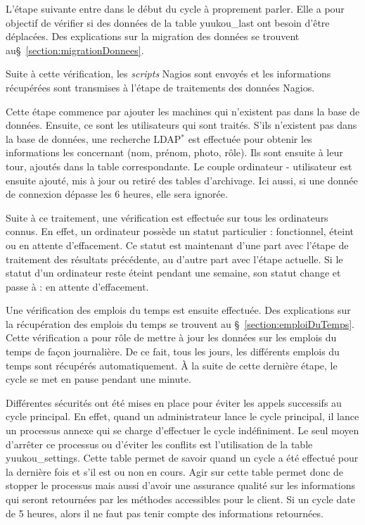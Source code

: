 L'\'etape suivante entre dans le d\'ebut du cycle \`a proprement parler.
Elle a pour objectif de v\'erifier si des donn\'ees de la table \textsf{yuukou\_last} ont besoin d'\^etre d\'eplac\'ees.
Des explications sur la migration des donn\'ees se trouvent au\S~\ref{section:migrationDonnees}.

Suite \`a cette v\'erification, les \textit{scripts} Nagios sont envoy\'es et les informations r\'ecup\'er\'ees sont transmises \`a l'\'etape de traitements des donn\'ees Nagios.

Cette \'etape commence par ajouter les machines qui n'existent pas dans la base de donn\'ees.
Ensuite, ce sont les utilisateurs qui sont trait\'es.
S'ils n'existent pas dans la base de donn\'ees, une recherche LDAP$^*$ est effectu\'ee pour obtenir les informations les concernant (nom, pr\'enom, photo, r\^ole).
Ils sont ensuite \`a leur tour, ajout\'es dans la table correspondante.
Le couple ordinateur - utilisateur est ensuite ajout\'e, mis \`a jour ou retir\'e des tables d'archivage.
Ici aussi, si une donn\'ee de connexion d\'epasse les 6 heures, elle sera ignor\'ee.

Suite \`a ce traitement, une v\'erification est effectu\'ee sur tous les ordinateurs connus.
En effet, un ordinateur poss\`ede un statut particulier : fonctionnel, \'eteint ou en attente d'effacement.
Ce statut est maintenant d'une part avec l'\'etape de traitement des r\'esultats pr\'ec\'edente, au d'autre part avec l'\'etape actuelle.
Si le statut d'un ordinateur reste \'eteint pendant une semaine, son statut change et passe \`a : en attente d'effacement.

Une v\'erification des emplois du temps est ensuite effectu\'ee.
Des explications sur la r\'ecup\'eration des emplois du temps se trouvent au \S~\ref{section:emploiDuTemps}.
Cette v\'erification a pour r\^ole de mettre \`a jour les donn\'ees sur les emplois du temps de fa\c{c}on journali\`ere.
De ce fait, tous les jours, les diff\'erents emplois du temps sont r\'ecup\'er\'es automatiquement.
\`A la suite de cette derni\`ere \'etape, le cycle se met en pause pendant une minute.

Diff\'erentes s\'ecurit\'es ont \'et\'e mises en place pour \'eviter les appels successifs au cycle principal.
En effet, quand un administrateur lance le cycle principal, il lance un processus annexe qui se charge d'effectuer le cycle ind\'efiniment.
Le seul moyen d'arr\^eter ce processus ou d'\'eviter les conflits est l'utilisation de la table \textsf{yuukou\_settings}.
Cette table permet de savoir quand un cycle a \'et\'e effectu\'e pour la derni\`ere fois et s'il est ou non en cours.
Agir sur cette table permet donc de stopper le processus mais aussi d'avoir une assurance qualit\'e sur les informations qui seront retourn\'ees par les m\'ethodes accessibles pour le client.
Si un cycle date de 5 heures, alors il ne faut pas tenir compte des informations retourn\'ees.


